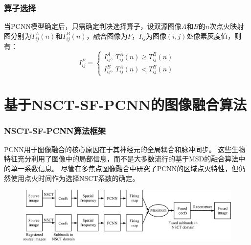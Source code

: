 \documentclass[10pt,aspectratio=43,mathserif]{beamer}
\begin{document}
\begin{frame}
		  \frametitle{\textbf{算子选择}}
        当PCNN模型确定后，只需确定判决选择算子，设双源图像$A$和$B$的$n$次点火映射图分别为$T_{ij}^A(n)$和$T_{ij}^B(n)$，融合图像为$F$，$I_{ij}$为图像$(i,j)$处像素灰度值，则有：
        \begin{equation*}
I_{ij}^F = \left\{\begin{matrix}
I_{ij}^A ,~ T_{ij}^A(n) \geq T_{ij}^B(n)\\ 
I_{ij}^B ,~ T_{ij}^A(n) < T_{ij}^B(n)
\end{matrix}\right.
\end{equation*}
\end{frame}
\section[NSCT-SF-PCNN]{基于NSCT-SF-PCNN的图像融合算法}
    
        \begin{frame}
		  \frametitle{\textbf{NSCT-SF-PCNN算法框架}}
			PCNN用于图像融合的核心原因在于其神经元的全局耦合和脉冲同步。 
这些生物特征充分利用了图像中的局部信息，而不是大多数流行的基于MSD的融合算法中的单一系数信息。 
尽管在多焦点图像融合中研究了PCNN的区域点火特性，但仍然使用点火时间作为选择NSCT系数的确定。

\begin{figure}[ht] %
	\centering
	\includegraphics[width=0.8\linewidth]{./figures/pcnn/NSCT-SF-PCNN.png} %
\end{figure}
		\end{frame}
\end{document}
